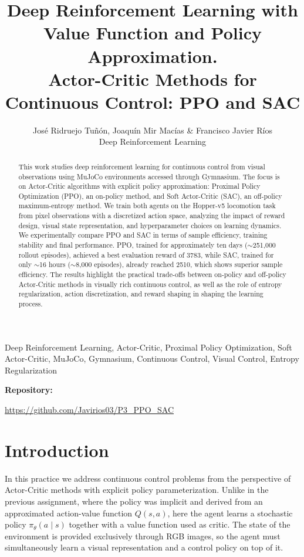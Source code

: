 \documentclass[onecolumn]{cwpreport} %
\title[]{Deep Reinforcement Learning with Value Function and Policy Approximation.\\ Actor-Critic Methods for Continuous Control: PPO and SAC}
\author[]{José Ridruejo Tuñón, Joaquín Mir Macías \& Francisco Javier Ríos
\\
Deep Reinforcement Learning}
\makeatletter
\renewcommand{\left@zm}{0pt} %
\newenvironment{Repository}{%
    \list{}{%
        \labelwidth\z@ \labelsep\z@
        \leftmargin\left@zm \rightmargin\z@
        \parsep 0pt plus 1pt
    }%
    \item[]\reset@font\large{\bf Repository: }
}{%
    \endlist
}
\makeatother
\begin{document}
\maketitle

\journal{}

\begin{abstract}
    This work studies deep reinforcement learning for continuous control from visual observations using MuJoCo environments accessed through Gymnasium. The focus is on Actor-Critic algorithms with explicit policy approximation: Proximal Policy Optimization (PPO), an on-policy method, and Soft Actor-Critic (SAC), an off-policy maximum-entropy method. We train both agents on the Hopper-v5 locomotion task from pixel observations with a discretized action space, analyzing the impact of reward design, visual state representation, and hyperparameter choices on learning dynamics. We experimentally compare PPO and SAC in terms of sample efficiency, training stability and final performance. PPO, trained for approximately ten days ($\sim$251{,}000 rollout episodes), achieved a best evaluation reward of 3783, while SAC, trained for only $\sim$16 hours ($\sim$8{,}000 episodes), already reached 2510, which shows superior sample efficiency. The results highlight the practical trade-offs between on-policy and off-policy Actor-Critic methods in visually rich continuous control, as well as the role of entropy regularization, action discretization, and reward shaping in shaping the learning process.
\end{abstract}

\begin{keywords}
    Deep Reinforcement Learning, Actor-Critic, Proximal Policy Optimization, Soft Actor-Critic, MuJoCo, Gymnasium, Continuous Control, Visual Control, Entropy Regularization
\end{keywords}

\begin{Repository}
    \url{https://github.com/Javirios03/P3_PPO_SAC}
\end{Repository}

\section{Introduction}

In this practice we address continuous control problems from the perspective of Actor-Critic methods with explicit policy parameterization. Unlike in the previous assignment, where the policy was implicit and derived from an approximated action-value function $Q(s,a)$, here the agent learns a stochastic policy $\pi_\theta(a \mid s)$ together with a value function used as critic. The state of the environment is provided exclusively through RGB images, so the agent must simultaneously learn a visual representation and a control policy on top of it.
\end{document}
